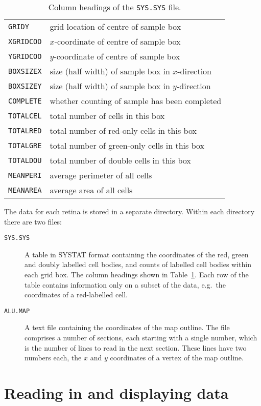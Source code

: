 \documentclass{article}
\begin{document}
\begin{table}
\begin{tabular}{ll}
    \texttt{GRIDY}    & grid location of centre of sample box \\
    \texttt{XGRIDCOO} & $x$-coordinate of centre of sample box \\
    \texttt{YGRIDCOO} & $y$-coordinate of centre of sample box \\
    \texttt{BOXSIZEX} & size (half width) of sample box in $x$-direction \\
    \texttt{BOXSIZEY} & size (half width) of sample box in $y$-direction \\
    \texttt{COMPLETE} & whether counting of sample has been completed\\
    \texttt{TOTALCEL} & total number of cells in this box\\
    \texttt{TOTALRED} & total number of red-only cells in this box\\
    \texttt{TOTALGRE} & total number of green-only cells in this box\\
    \texttt{TOTALDOU} & total number of double cells in this box\\
    \texttt{MEANPERI} & average perimeter of all cells \\
    \texttt{MEANAREA} & average area of all cells \\
  \end{tabular}
  \caption{Column headings of the \texttt{SYS.SYS} file.}
  \label{tab:data-format}
\end{table}

The data for each retina is stored in a separate directory. Within
each directory there are two files:
\begin{description}
\item[\texttt{SYS.SYS}] A table in SYSTAT format containing the
  coordinates of the red, green and doubly labelled cell bodies, and
  counts of labelled cell bodies within each grid box. The column
  headings shown in Table~\ref{tab:data-format}.  Each row of the
  table contains information only on a subset of the data, e.g.\ the
  coordinates of a red-labelled cell.
\item[\texttt{ALU.MAP}] A text file containing the coordinates of the
  map outline. The file comprises a number of sections, each starting
  with a single number, which is the number of lines to read in the
  next section. These lines have two numbers each, the $x$ and $y$
  coordinates of a vertex of the map outline.
\end{description}

\section{Reading in and displaying data}
\label{manual:sec:datafile-utils}
\end{document}

